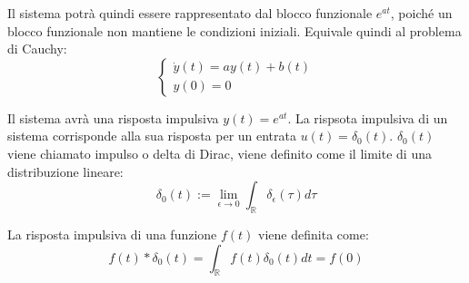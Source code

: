 \documentclass{article}
\numberwithin{equation}{subsection}
\begin{document}
Il sistema potrà quindi essere rappresentato dal blocco funzionale $e^{at}$, poiché un blocco funzionale non mantiene le condizioni iniziali. Equivale quindi al 
problema di Cauchy:
\begin{equation}
    \begin{cases}
        \dot y(t)=ay(t)+b(t)\\
        y(0)=0
    \end{cases}
\end{equation}
\begin{center}
\end{center}

Il sistema avrà una risposta impulsiva $y(t)=e^{at}$. La rispsota impulsiva di un sistema corrisponde alla sua risposta per un entrata $u(t)=\delta_0(t)$. 
$\delta_0(t)$ viene chiamato impulso o delta di Dirac, viene definito come il limite di una distribuzione lineare:
\begin{equation}
    \delta_0(t):=\displaystyle\lim_{\epsilon\to0}\int_{\mathbb{R}}\delta_{\epsilon}(\tau)d\tau
\end{equation}
\begin{center}
\end{center}
La risposta impulsiva di una funzione $f(t)$ viene definita come:
\begin{equation}
    f(t)*\delta_0(t)=\int_{\mathbb{R}}f(t)\delta_0(t)dt=f(0)
\end{equation}
\end{document}
